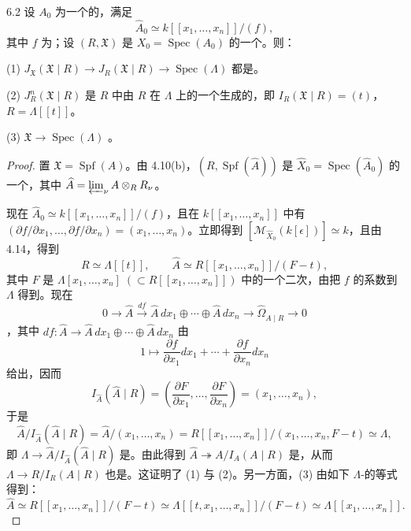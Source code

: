 \begin{SGAresult}{}{6.2}
设 $A_0$ 为一个的，满足
\[
\widehat A_0\simeq k[[x_1,\ldots,x_n]]/(f),
\]
其中 $f$ 为；设 $(R,\mathfrak X)$ 是 $X_0=\operatorname{Spec}(A_0)$ 的一个。则：

(1) $J_{\mathfrak X}(\mathfrak X\mid R)\to J_R(\mathfrak X\mid R)\to\operatorname{Spec}(\Lambda)$ 都是。

(2) $J_R^n(\mathfrak X\mid R)$ 是 $R$ 中由 $R$ 在 $\Lambda$ 上的一个生成的，即 $I_R(\mathfrak X\mid R)=(t)$，$R=\Lambda[[t]]$。

(3) $\mathfrak X\to\operatorname{Spec}(\Lambda)$ 。
\end{SGAresult}
\begin{proof}
置 $\mathfrak X=\operatorname{Spf}(A)$。由 4.10(b)，$(R,\operatorname{Spf}(\widehat A))$ 是 $\widehat X_0=\operatorname{Spec}(\widehat A_0)$ 的一个，其中 $\widehat A=\varprojlim_\nu A\otimes_R R_\nu$。

现在 $\widehat A_0\simeq k[[x_1,\ldots,x_n]]/(f)$，且在 $k[[x_1,\ldots,x_n]]$ 中有 $(\partial f/\partial x_1,\ldots,\partial f/\partial x_n)=(x_1,\ldots,x_n)$。立即得到 $[\mathcal M_{\widehat X_0}(k[\epsilon])]\simeq k$，且由 4.14，得到
\[
R\simeq\Lambda[[t]],\qquad
\widehat A\simeq R[[x_1,\ldots,x_n]]/(F-t),
\]
其中 $F$ 是 $\Lambda[x_1,\ldots,x_n]\;(\subset R[[x_1,\ldots,x_n]])$ 中的一个二次，由把 $f$ 的系数到 $\Lambda$ 得到。现在
\[
0\longrightarrow\widehat A\xrightarrow{df}
\widehat A\,dx_1\oplus\cdots\oplus\widehat A\,dx_n
\longrightarrow\widehat\Omega_{\widehat A\mid R}\longrightarrow0
\]
，其中 $df:\widehat A\to\widehat A\,dx_1\oplus\cdots\oplus\widehat A\,dx_n$ 由
\[
1\longmapsto\frac{\partial f}{\partial x_1}dx_1+\cdots+\frac{\partial f}{\partial x_n}dx_n
\]
给出，因而
\[
I_{\widehat A}(\widehat A\mid R)=
\left(\frac{\partial F}{\partial x_1},\ldots,\frac{\partial F}{\partial x_n}\right)=(x_1,\ldots,x_n),
\]
于是
\[
\widehat A/I_{\widehat A}(\widehat A\mid R)
 =\widehat A/(x_1,\ldots,x_n)
 =R[[x_1,\ldots,x_n]]/(x_1,\ldots,x_n,F-t)\simeq\Lambda,
\]
即 $\Lambda\to\widehat A/I_{\widehat A}(\widehat A\mid R)$ 是。由此得到 $\widehat A\twoheadrightarrow A/I_A(A\mid R)$ 是，从而 $\Lambda\to R/I_R(A\mid R)$ 也是。这证明了 (1) 与 (2)。另一方面，(3) 由如下 $\Lambda$-的等式得到：
\[
\widehat A\simeq R[[x_1,\ldots,x_n]]/(F-t)
 \simeq\Lambda[[t,x_1,\ldots,x_n]]/(F-t)
 \simeq\Lambda[[x_1,\ldots,x_n]].
\]
\end{proof}

